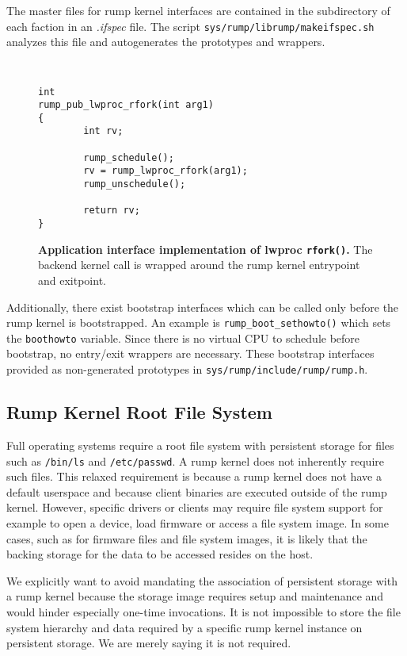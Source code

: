 The master files for rump kernel interfaces are contained in the
subdirectory of each faction in an \textit{.ifspec} file.  The
script \texttt{sys/rump/librump/makeifspec.sh} analyzes this
file and autogenerates the prototypes and wrappers.

\begin{figure}[t]
{\tt \scriptsize  
\begin{verbatim}
int
rump_pub_lwproc_rfork(int arg1)
{
        int rv;

        rump_schedule();
        rv = rump_lwproc_rfork(arg1);
        rump_unschedule();

        return rv;
}
\end{verbatim}}
\caption[Application interface implementation of lwproc \texttt{rfork()}]{
\textbf{Application interface implementation of lwproc \texttt{rfork()}.}
The backend kernel call is wrapped around the rump kernel entrypoint
and exitpoint.
}
\label{fig:rumppubrfork}
\end{figure}

Additionally, there exist bootstrap interfaces
which can be called only before the rump kernel is bootstrapped.
An example is \verb+rump_boot_sethowto()+ which sets the
\texttt{boothowto} variable.  Since there is no virtual
CPU to schedule before bootstrap, no entry/exit wrappers are
necessary.  These bootstrap interfaces provided as non-generated prototypes
in \verb+sys/rump/include/rump/rump.h+.


\subsection{Rump Kernel Root File System}
\label{sect:rumpfs}

Full operating systems require a root file system with persistent
storage for files such as \texttt{/bin/ls} and \texttt{/etc/passwd}.
A rump kernel does not inherently require such files.  This relaxed
requirement is because a rump kernel does not have a default userspace
and because client binaries are executed outside of the rump kernel.
However, specific drivers or clients may require file system support for example
to open a device, load firmware or access a file system image.  In some
cases, such as for firmware files and file system images, it is likely
that the backing storage for the data to be accessed resides on the host.

We explicitly want to avoid mandating the association of persistent
storage with a rump kernel because the storage image requires setup
and maintenance and would hinder especially one-time invocations.
It is not impossible to store the file system
hierarchy and data required by a specific rump kernel instance on
persistent storage.  We are merely saying it is not required.

